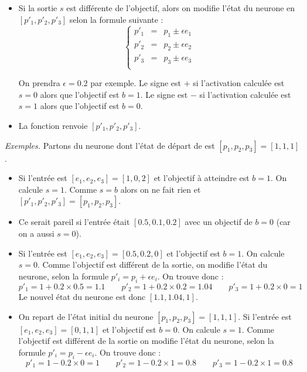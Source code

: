\documentclass[11pt,class=report,crop=false]{standalone}
\begin{document}
\begin{activite}[Neurone]
\begin{enumerate}
\begin{itemize}
		\item Si la sortie $s$ est différente de l'objectif, alors on modifie l'état du neurone en $[p'_1,p'_2,p'_3]$ selon la formule suivante :
		$$\left\{ 
		\begin{array}{rcl}
		p'_1 &=& p_1 \pm \epsilon e_1 \\
		p'_2 &=& p_2 \pm \epsilon e_2 \\
		p'_3 &=& p_3 \pm \epsilon e_3 \\
		\end{array}
		\right.$$		

		On prendra $\epsilon = 0.2$ par exemple.
		Le signe est \og{}$+$\fg{} si l'activation calculée est $s=0$ alors que l'objectif est $b=1$.
		Le signe est \og{}$-$\fg{} si l'activation calculée est $s=1$ alors que l'objectif est $b=0$.
		
		\item La fonction renvoie $[p'_1,p'_2,p'_3]$.
	\end{itemize}			
		
	\medskip
	
	\emph{Exemples.}
	Partons du neurone dont l'état de départ de  est $[p_1,p_2,p_3] = [1,1,1]$.
	\begin{itemize}
		\item Si l'entrée est $[e_1,e_2,e_3] = [1,0,2]$ et l'objectif à atteindre est $b=1$. On calcule $s=1$.
		Comme $s=b$ alors on ne fait rien et $[p'_1,p'_2,p'_3] = [p_1,p_2,p_3]$.
		
		\item Ce serait pareil si l'entrée était $[0.5,0.1,0.2]$ avec un objectif de $b=0$ (car on a aussi $s=0$).
		
		\item Si l'entrée est $[e_1,e_2,e_3] = [0.5,0.2,0]$ et l'objectif est $b=1$. On calcule $s=0$.
		Comme l'objectif est différent de la sortie, on modifie l'état du neurone, selon la formule 
		$p'_i = p_i + \epsilon e_i$. On trouve donc :
	$$p'_1 = 1 + 0.2 \times 0.5 = 1.1 \qquad p'_2 = 1 + 0.2 \times 0.2 = 1.04 \qquad p'_3 = 1 + 0.2 \times 0 = 1$$
		Le nouvel état du neurone est donc $[1.1,1.04,1]$.

		
		\item On repart de l'état initial du neurone $[p_1,p_2,p_3] = [1,1,1]$.
		Si l'entrée est $[e_1,e_2,e_3] = [0,1,1]$ et l'objectif est $b=0$. On calcule $s=1$.
		Comme l'objectif est différent de la sortie on modifie l'état du neurone, selon la formule 
		$p'_i = p_i - \epsilon e_i$. On trouve donc :
		$$p'_1 = 1 - 0.2 \times 0 = 1 \qquad p'_2 = 1 - 0.2 \times 1 = 0.8 \qquad p'_3 = 1 - 0.2 \times 1 = 0.8$$
		

\end{itemize}
\end{enumerate}
\end{activite}
\end{document}
